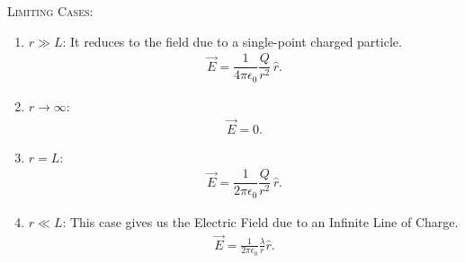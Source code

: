 \documentclass[12pt,b4paper]{article}
\begin{document}
\textsc{Limiting Cases}: \begin{enumerate}
\itemsep0em 
    \item $r \gg L$: It reduces to the field due to a single-point charged particle. 
    \begin{align}
    \vec{E} = \dfrac{1}{4 \pi \epsilon_0} \dfrac{Q}{r^2}\,\hat{r}.
    \end{align}
    \item $r\to\infty$: 
    \begin{align}
    \vec{E} = 0.
    \end{align}
    \item $r=L$: 
    \begin{align}
    \vec{E} = \dfrac{1}{2 \pi \epsilon_0} \dfrac{Q}{r^2}\,\hat{r}.
    \end{align}
    \item $r\ll L$: This case gives us the Electric Field due to an Infinite Line of Charge.
    \begin{align}
        \vec{E} = \frac{1}{2\pi\epsilon_0}\frac{\lambda}{r}\hat{r}.\label{eq:infinite-line-charge-field}
    \end{align}
\end{enumerate}  
\end{document}
